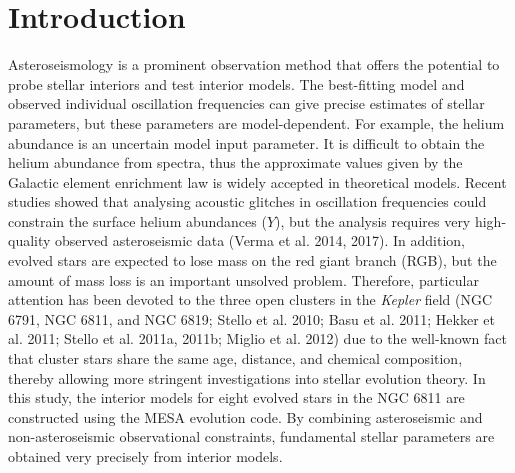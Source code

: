\documentclass[a4paper,fleqn,usenatbib]{mnras}     %
\begin{document}

\section{Introduction}

Asteroseismology
is a prominent observation method
that offers the potential to probe 
stellar interiors and test interior models. 
The best-fitting model 
and observed individual oscillation frequencies 
can give precise estimates of stellar parameters, 
but these parameters are model-dependent.
For example, the helium abundance is 
 an uncertain model input parameter.
It is difficult to obtain
the helium abundance
 from spectra,
thus
the approximate values given by the
Galactic element enrichment law is 
widely accepted in theoretical models.
Recent studies showed that 
analysing acoustic glitches in oscillation frequencies 
could constrain 
the surface helium abundances ($Y$), 
but the analysis requires very 
high-quality observed asteroseismic data
(Verma et al. 2014, 2017).
In addition, evolved stars are expected to 
lose mass on the red giant branch (RGB), 
but
the amount of mass loss is an important unsolved problem. 
Therefore, particular attention has been 
devoted to the three open clusters in the {\emph{Kepler}} field (NGC 6791, NGC 6811, and NGC 6819; Stello et al. 2010; Basu et al. 2011; Hekker et al. 2011; Stello et al. 2011a, 2011b; Miglio et al. 2012) due to the well-known fact that 
cluster stars share the same age, distance, 
and chemical composition, 
thereby allowing 
more stringent investigations into stellar evolution theory.
In this study, the interior models for eight evolved
stars in the NGC 6811
 are constructed 
using the {\small {MESA}} evolution code. 
By combining asteroseismic and non-asteroseismic 
observational constraints, fundamental stellar parameters
are obtained 
very precisely from interior models. 
\end{document}
